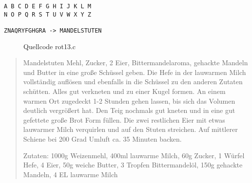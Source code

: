 \begin{lstlisting}
A B C D E F G H I J K L M
N O P Q R S T U V W X Y Z

ZNAQRYFGHGRA -> MANDELSTUTEN
\end{lstlisting}

\begin{figure}[tb]

\caption{Quellcode rot13.c}
\label{listingrot13}
\end{figure}

\begin{quote}
Mandelstuten
Mehl, Zucker, 2 Eier, Bittermandelaroma, gehackte Mandeln und Butter in eine große Schüssel geben.
Die Hefe in der lauwarmen Milch vollständig auflösen und ebenfalls in die Schüssel zu den anderen Zutaten schütten. Alles gut verkneten und zu einer Kugel formen.
An einem warmen Ort zugedeckt 1-2 Stunden gehen lassen, bis sich das Volumen deutlich vergrößert hat.
Den Teig nochmals gut kneten und in eine gut gefettete große Brot Form füllen.
Die zwei restlichen Eier mit etwas lauwarmer Milch verquirlen und auf den Stuten streichen.
Auf mittlerer Schiene bei 200 Grad Umluft ca. 35 Minuten backen.

Zutaten: 1000g Weizenmehl, 400ml lauwarme Milch, 60g Zucker, 1 Würfel Hefe, 4 Eier, 50g weiche Butter, 3 Tropfen Bittermandelöl,
150g gehackte Mandeln, 4 EL lauwarme Milch
\end{quote}

